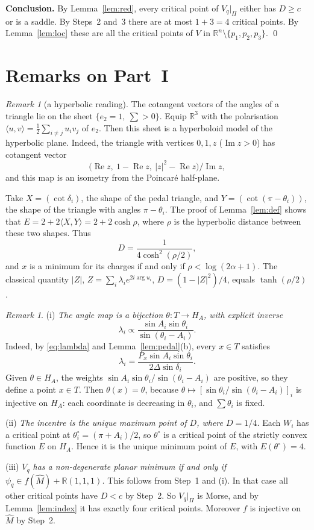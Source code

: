 \documentclass[11pt]{amsart}
\theoremstyle{remark}
\newtheorem{remark}[theorem]{Remark}
\newcommand{\R}{\mathbb{R}}
\begin{document}
\medskip\noindent\textbf{Conclusion.} By Lemma~\ref{lem:red}, every critical point of $V_q|_\Pi$ either has $D\ge c$ or is a
saddle. By Steps~2 and~3 there are at most $1+3=4$ critical points. By Lemma~\ref{lem:loc} these are all the critical
points of $V$ in $\R^n\setminus\{p_1,p_2,p_3\}$. \qed

\section{Remarks on Part~I}\label{sec:rem1}

\begin{remark}[a hyperbolic reading]\label{rem:hyp}
The cotangent vectors of the angles of a triangle lie on the sheet $\{e_2=1,\ \sum>0\}$. Equip $\R^3$ with the
polarisation $\langle u,v\rangle=\frac12\sum_{i\ne j}u_iv_j$ of $e_2$. Then this sheet is a hyperboloid model of the
hyperbolic plane. Indeed, the triangle with vertices $0,1,z$ ($\operatorname{Im}z>0$) has cotangent vector
\[
  \bigl(\operatorname{Re}z,\ 1-\operatorname{Re}z,\ |z|^2-\operatorname{Re}z\bigr)/\operatorname{Im}z,
\]
and this map is an isometry from the Poincar\'e half-plane.

Take $X=(\cot\delta_i)$, the shape of the pedal triangle, and $Y=(\cot(\pi-\theta_i))$, the shape of the triangle with
angles $\pi-\theta_i$. The proof of Lemma~\ref{lem:def} shows that $E=2+2\langle X,Y\rangle=2+2\cosh\rho$, where $\rho$ is
the hyperbolic distance between these two shapes. Thus
\[
  D=\frac{1}{4\cosh^2(\rho/2)},
\]
and $x$ is a minimum for its charges if and only if $\rho<\log(2\alpha+1)$. The classical quantity
$|Z|$, $Z=\sum_i\lambda_ie^{2i\arg u_i}$, $D=(1-|Z|^2)/4$, equals $\tanh(\rho/2)$.
\end{remark}

\begin{remark}
(i) \emph{The angle map is a bijection $\theta\colon T\to H_A$, with explicit inverse}
\[
  \lambda_i\propto\frac{\sin A_i\sin\theta_i}{\sin(\theta_i-A_i)} .
\]
Indeed, by \eqref{eq:lambda} and Lemma~\ref{lem:pedal}(b), every $x\in T$ satisfies
\[
  \lambda_i=\frac{P_x\sin A_i\sin\theta_i}{2\Delta\sin\delta_i}.
\]
Given $\theta\in H_A$, the weights $\sin A_i\sin\theta_i/\sin(\theta_i-A_i)$ are positive, so they define a point
$x\in T$. Then $\theta(x)=\theta$, because $\theta\mapsto[\sin\theta_i/\sin(\theta_i-A_i)]_i$ is injective on $H_A$:
each coordinate is decreasing in $\theta_i$, and $\sum\theta_i$ is fixed.

(ii) \emph{The incentre is the unique maximum point of $D$, where $D=1/4$.} Each $W_i$ has a critical point at
$\theta_i^\circ=(\pi+A_i)/2$, so $\theta^\circ$ is a critical point of the strictly convex function $E$ on $H_A$. Hence
it is the unique minimum point of $E$, with $E(\theta^\circ)=4$.

(iii) \emph{$V_q$ has a non-degenerate planar minimum if and only if $\psi_q\in f(\widehat M)+\R(1,1,1)$.} This follows
from Step~1 and (i). In that case all other critical points have $D<c$ by Step~2. So $V_q|_\Pi$ is Morse, and by
Lemma~\ref{lem:index} it has exactly four critical points. Moreover $f$ is injective on $\widehat M$ by Step~2.
\end{remark}
\end{document}
